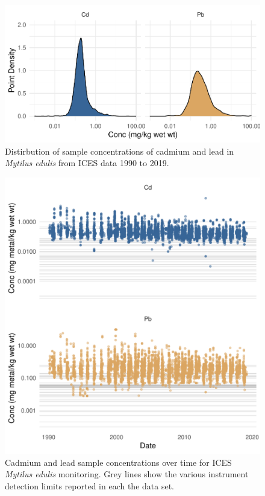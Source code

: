 \documentclass[
  12pt,
]{article}
\begin{document}
\begin{figure}
\centering
\includegraphics{McCrory_ENV972_Project_files/figure-latex/unnamed-chunk-3-1.pdf}
\caption{Distirbution of sample concentrations of cadmium and lead in
\emph{Mytilus edulis} from ICES data 1990 to 2019.}
\end{figure}

\begin{figure}
\centering
\includegraphics{McCrory_ENV972_Project_files/figure-latex/unnamed-chunk-4-1.pdf}
\caption{Cadmium and lead sample concentrations over time for ICES
\emph{Mytilus edulis} monitoring. Grey lines show the various instrument
detection limits reported in each the data set.}
\end{figure}
\end{document}
